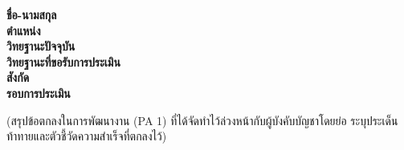 \vspace{6pt}

\noindent\textbf{ชื่อ-นามสกุล} \\
\textbf{ตำแหน่ง} \quad [ตำแหน่ง]\\
\textbf{วิทยฐานะปัจจุบัน} \quad [วิทยฐานะปัจจุบัน]\\
\textbf{วิทยฐานะที่ขอรับการประเมิน} \\
\textbf{สังกัด} \\
\textbf{รอบการประเมิน} \quad [วันที่เริ่มต้น -- วันที่สิ้นสุด]

\vspace{12pt}
\noindent (สรุปข้อตกลงในการพัฒนางาน (PA 1) ที่ได้จัดทำไว้ล่วงหน้ากับผู้บังคับบัญชาโดยย่อ
ระบุประเด็นท้าทายและตัวชี้วัดความสำเร็จที่ตกลงไว้)
